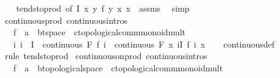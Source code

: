 \begin{isabellebody}
%
\isadelimproof
\ \ %
\endisadelimproof
%
\isatagproof
{}\isamarkupfalse%
\ tendsto{\isacharunderscore}{\kern0pt}prod{\isacharprime}{\kern0pt}\ {\isacharbrackleft}{\kern0pt}of\ I\ {\isachardoublequoteopen}{\isasymlambda}x\ y{\isachardot}{\kern0pt}\ f\ y\ x{\isachardoublequoteclose}\ {\isachardoublequoteopen}{\isasymlambda}x{\isachardot}{\kern0pt}\ {}{\isachardoublequoteclose}{\isacharbrackright}{\kern0pt}\ assms\ \isamarkupfalse%
\ simp%
\endisatagproof
{\isafoldproof}%
%
\isadelimproof
\isanewline
%
\endisadelimproof
\isanewline
{}\isamarkupfalse%
\ continuous{\isacharunderscore}{\kern0pt}prod{\isacharprime}{\kern0pt}\ {\isacharbrackleft}{\kern0pt}continuous{\isacharunderscore}{\kern0pt}intros{\isacharbrackright}{\kern0pt}{\isacharcolon}{\kern0pt}\isanewline
\ \ \ f\ {\isacharcolon}{\kern0pt}{\isacharcolon}{\kern0pt}\ {\isachardoublequoteopen}{\isacharprime}{\kern0pt}a\ {\isasymRightarrow}\ {\isacharprime}{\kern0pt}b{\isacharcolon}{\kern0pt}{\isacharcolon}{\kern0pt}t{}{\isacharunderscore}{\kern0pt}space\ {\isasymRightarrow}\ {\isacharprime}{\kern0pt}c{\isacharcolon}{\kern0pt}{\isacharcolon}{\kern0pt}topological{\isacharunderscore}{\kern0pt}comm{\isacharunderscore}{\kern0pt}monoid{\isacharunderscore}{\kern0pt}mult{\isachardoublequoteclose}\isanewline
\ \ \ {\isachardoublequoteopen}{\isacharparenleft}{\kern0pt}{\isasymAnd}i{\isachardot}{\kern0pt}\ i\ {\isasymin}\ I\ {\isasymLongrightarrow}\ continuous\ F\ {\isacharparenleft}{\kern0pt}f\ i{\isacharparenright}{\kern0pt}{\isacharparenright}{\kern0pt}\ {\isasymLongrightarrow}\ continuous\ F\ {\isacharparenleft}{\kern0pt}{\isasymlambda}x{\isachardot}{\kern0pt}\ {\isasymProd}i{\isasymin}I{\isachardot}{\kern0pt}\ f\ i\ x{\isacharparenright}{\kern0pt}{\isachardoublequoteclose}\isanewline
%
\isadelimproof
\ \ %
\endisadelimproof
%
\isatagproof
{}\isamarkupfalse%
\ continuous{\isacharunderscore}{\kern0pt}def\ \isamarkupfalse%
\ {\isacharparenleft}{\kern0pt}rule\ tendsto{\isacharunderscore}{\kern0pt}prod{\isacharprime}{\kern0pt}{\isacharparenright}{\kern0pt}%
\endisatagproof
{\isafoldproof}%
%
\isadelimproof
\isanewline
%
\endisadelimproof
\isanewline
{}\isamarkupfalse%
\ continuous{\isacharunderscore}{\kern0pt}on{\isacharunderscore}{\kern0pt}prod{\isacharprime}{\kern0pt}\ {\isacharbrackleft}{\kern0pt}continuous{\isacharunderscore}{\kern0pt}intros{\isacharbrackright}{\kern0pt}{\isacharcolon}{\kern0pt}\isanewline
\ \ \ f\ {\isacharcolon}{\kern0pt}{\isacharcolon}{\kern0pt}\ {\isachardoublequoteopen}{\isacharprime}{\kern0pt}a\ {\isasymRightarrow}\ {\isacharprime}{\kern0pt}b{\isacharcolon}{\kern0pt}{\isacharcolon}{\kern0pt}topological{\isacharunderscore}{\kern0pt}space\ {\isasymRightarrow}\ {\isacharprime}{\kern0pt}c{\isacharcolon}{\kern0pt}{\isacharcolon}{\kern0pt}topological{\isacharunderscore}{\kern0pt}comm{\isacharunderscore}{\kern0pt}monoid{\isacharunderscore}{\kern0pt}mult{\isachardoublequoteclose}\isanewline

\end{isabellebody}
